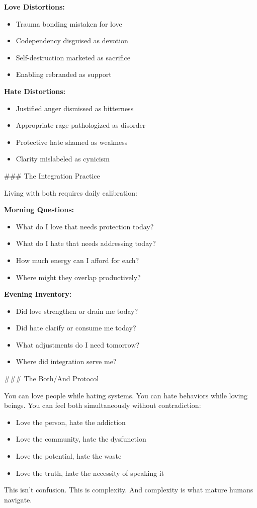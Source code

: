 \documentclass[12pt]{book}
\begin{document}
\textbf{Love Distortions:}
\begin{itemize}
\item Trauma bonding mistaken for love
\item Codependency disguised as devotion
\item Self-destruction marketed as sacrifice
\item Enabling rebranded as support

\end{itemize}
\textbf{Hate Distortions:}
\begin{itemize}
\item Justified anger dismissed as bitterness
\item Appropriate rage pathologized as disorder
\item Protective hate shamed as weakness
\item Clarity mislabeled as cynicism

\end{itemize}
\#\#\# The Integration Practice

Living with both requires daily calibration:

\textbf{Morning Questions:}
\begin{itemize}
\item What do I love that needs protection today?
\item What do I hate that needs addressing today?
\item How much energy can I afford for each?
\item Where might they overlap productively?

\end{itemize}
\textbf{Evening Inventory:}
\begin{itemize}
\item Did love strengthen or drain me today?
\item Did hate clarify or consume me today?
\item What adjustments do I need tomorrow?
\item Where did integration serve me?

\end{itemize}
\#\#\# The Both/And Protocol

You can love people while hating systems. You can hate behaviors while loving beings. You can feel both simultaneously without contradiction:

\begin{itemize}
\item Love the person, hate the addiction
\item Love the community, hate the dysfunction
\item Love the potential, hate the waste
\item Love the truth, hate the necessity of speaking it

\end{itemize}
This isn't confusion. This is complexity. And complexity is what mature humans navigate.
\end{document}
